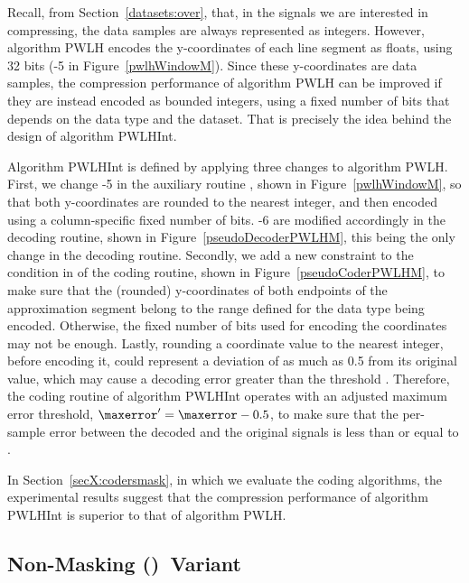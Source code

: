 Recall, from Section~\ref{datasets:over}, that, in the signals we are interested in compressing, the data samples are always represented as integers. However, algorithm PWLH encodes the y-coordinates of each line segment as floats, using 32 bits (-5 in Figure~\ref{pwlhWindowM}). Since these y-coordinates are data samples, the compression performance of algorithm PWLH can be improved if they are instead encoded as bounded integers, using a fixed number of bits that depends on the data type and the dataset. That is precisely the idea behind the design of algorithm PWLHInt.


Algorithm PWLHInt is defined by applying three changes to algorithm PWLH. First, we change -5 in the auxiliary routine \EncodeWindow, shown in Figure~\ref{pwlhWindowM}, so that both y-coordinates are rounded to the nearest integer, and then encoded using a column-specific fixed number of bits. -6 are modified accordingly in the decoding routine, shown in Figure~\ref{pseudoDecoderPWLHM}, this being the only change in the decoding routine. Secondly, we add a new constraint to the condition in  of the coding routine, shown in Figure~\ref{pseudoCoderPWLHM}, to make sure that the (rounded) y-coordinates of both endpoints of the approximation segment belong to the range defined for the data type being encoded. Otherwise, the fixed number of bits used for encoding the coordinates may not be enough. Lastly, rounding a coordinate value to the nearest integer, before encoding it, could represent a deviation of as much as 0.5 from its original value, which may cause a decoding error greater than the threshold \maxerror. Therefore, the coding routine of algorithm PWLHInt operates with an adjusted maximum error threshold, $\maxerror' = \maxerror - 0.5$, to make sure that the per-sample error between the decoded and the original signals is less than or equal to \maxerror.


In Section~\ref{secX:codersmask}, in which we evaluate the coding algorithms, the experimental results suggest that the compression performance of algorithm PWLHInt is superior to that of algorithm PWLH.




\subsection{Non-Masking (\NOmaskalgo)\ Variant}
\label{algo:pwhl:nmvariant}


